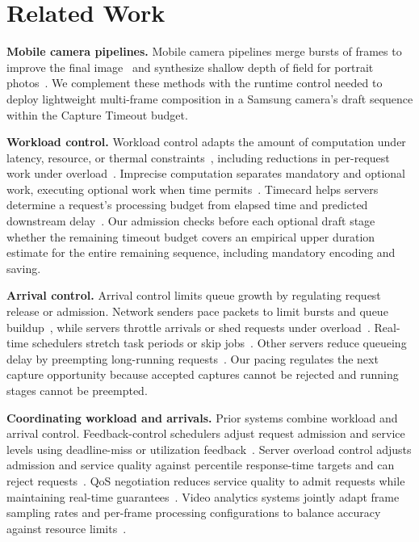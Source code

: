 \section{Related Work}
\label{sec:related_work}

\smallskip\noindent\textbf{Mobile camera pipelines.}
Mobile camera pipelines merge bursts of frames to improve the final image~\cite{hdrplus-burst-tog,handheld-superres-tog,lowlight-mobile-tog} and synthesize shallow depth of field for portrait photos~\cite{synthetic-dof-tog}.
We complement these methods with the runtime control needed to deploy lightweight multi-frame composition in a Samsung camera's draft sequence within the Capture Timeout budget.

\smallskip\noindent\textbf{Workload control.}
Workload control adapts the amount of computation under latency, resource, or thermal constraints~\cite{zilberstein-anytime,loop-perforation-fse,apnet-rtss,branchynet-icpr,approxdet-sensys,phoenix-tecs}, including reductions in per-request work under overload~\cite{abdelzaher-content-adaptation,klein-brownout}.
Imprecise computation separates mandatory and optional work, executing optional work when time permits~\cite{liu-imprecise-computation,shih-imprecise-siam}.
Timecard helps servers determine a request's processing budget from elapsed time and predicted downstream delay~\cite{timecard-sosp}.
Our admission checks before each optional draft stage whether the remaining timeout budget covers an empirical upper duration estimate for the entire remaining sequence, including mandatory encoding and saving.

\smallskip\noindent\textbf{Arrival control.}
Arrival control limits queue growth by regulating request release or admission.
Network senders pace packets to limit bursts and queue buildup~\cite{tcp-pacing-infocom,bbr-queue}, while servers throttle arrivals or shed requests under overload~\cite{seda-sosp,dagor-socc,breakwater-osdi}.
Real-time schedulers stretch task periods or skip jobs~\cite{buttazzo-elastic-task,koren-skip-over}.
Other servers reduce queueing delay by preempting long-running requests~\cite{shinjuku-nsdi}.
Our pacing regulates the next capture opportunity because accepted captures cannot be rejected and running stages cannot be preempted.

\smallskip\noindent\textbf{Coordinating workload and arrivals.}
Prior systems combine workload and arrival control.
Feedback-control schedulers adjust request admission and service levels using deadline-miss or utilization feedback~\cite{lu-feedback-control-edf,lu-feedback-control-scheduling}.
Server overload control adjusts admission and service quality against percentile response-time targets and can reject requests~\cite{welsh-overload-control}.
QoS negotiation reduces service quality to admit requests while maintaining real-time guarantees~\cite{abdelzaher-qos-negotiation}.
Video analytics systems jointly adapt frame sampling rates and per-frame processing configurations to balance accuracy against resource limits~\cite{chameleon-sigcomm,videostorm-nsdi}.

